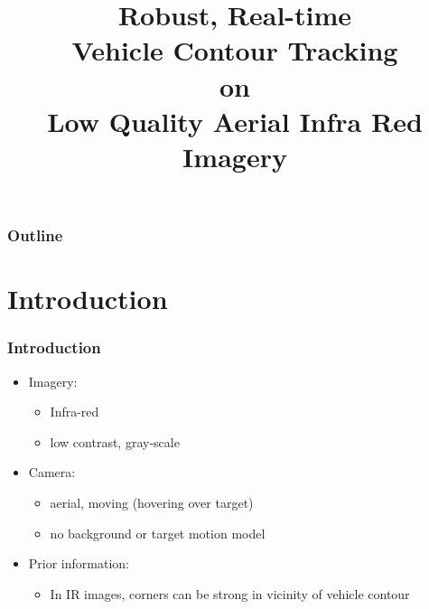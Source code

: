 
\title{Robust, Real-time \\Vehicle Contour Tracking \\on \\Low Quality Aerial Infra Red Imagery}


\begin{frame}[plain]
\logoTechTower\logoCSIPCPL
	\titlepage
\end{frame}


\begin{frame}
\frametitle{Outline}
\logoTechTower\logoCSIPCPL
	\tableofcontents
\end{frame}



\section{Introduction}
\begin{frame}
\frametitle{Introduction}
\logoCSIPCPL\mypagenum
	\begin{itemize}
		\item {\color{red} Imagery:} 
			\begin{itemize}
				\item Infra-red
				\item low contrast, gray-scale
			\end{itemize}
		\item {\color{red} Camera:} 
			\begin{itemize}
				\item aerial, moving (hovering over target)
				\item no background or target motion model
			\end{itemize}
		\item  {\color{red} Prior information:} 
			\begin{itemize}
				\item In IR images, corners can be strong in vicinity of vehicle contour
			\end{itemize}
	\end{itemize}
\end{frame}


